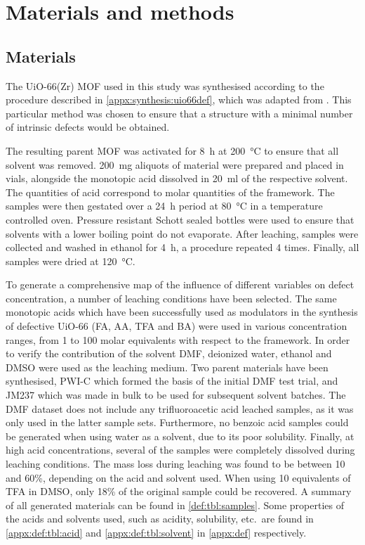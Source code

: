 
\section{Materials and methods}

\subsection{Materials}

The UiO-66(Zr) \gls{MOF} used in this study was synthesised according
to the procedure described in \autoref{appx:synthesis:uio66def},
which was adapted from \citet{shearerTunedPerfectionIroning2014}.
This particular method was chosen to ensure that a structure with
a minimal number of intrinsic defects would be obtained.

The resulting parent \gls{MOF} was activated for \SI{8}{\hour} at
\SI{200}{\degreeCelsius} to ensure that all solvent was removed.
\SI{200}{\milli\gram} aliquots of material were prepared and 
placed in vials, alongside the monotopic acid dissolved in
\SI{20}{\milli\litre} of the respective solvent. The quantities
of acid correspond to molar quantities of the framework.
The samples were then gestated over a \SI{24}{\hour} period
at \SI{80}{\degreeCelsius} in a temperature controlled oven.
Pressure resistant Schott sealed bottles were used to ensure that
solvents with a lower boiling point do not evaporate.
After leaching, samples were collected and washed in ethanol
for \SI{4}{\hour}, a procedure repeated 4 times. Finally, all 
samples were dried at \SI{120}{\degreeCelsius}.

To generate a comprehensive map of the influence
of different variables on defect concentration, a number of
leaching conditions have been selected. The same monotopic acids 
which have been successfully used
as modulators in the synthesis of defective UiO-66
(\gls{FA}, \gls{AA}, \gls{TFA} and \gls{BA}) 
were used in various concentration ranges,
from 1 to 100 molar equivalents with respect to the framework.
In order to verify the contribution of the solvent
\gls{DMF}, deionized water, ethanol and \gls{DMSO} 
were used as the leaching medium.
Two parent materials have been synthesised, PWI-C which formed 
the basis of the initial \gls{DMF} test trial, and JM237 which 
was made in bulk to be used for subsequent solvent batches.
The \gls{DMF} dataset does not include any trifluoroacetic acid
leached samples, as it was only used in the latter sample sets.
Furthermore, no benzoic acid samples could be generated when using
water as a solvent, due to its poor solubility. Finally, 
at high acid concentrations, several of the samples were completely
dissolved during leaching
conditions. The mass loss during leaching was found to be 
between 10 and 60\%, depending on the acid and solvent used.
When using 10 equivalents of \gls{TFA} in \gls{DMSO}, only 18\% of the 
original sample could be recovered. 
A summary of all generated materials can be found in
\autoref{def:tbl:samples}.
Some properties of the acids and solvents used, such as acidity,
solubility, etc.\ are found in 
\autoref{appx:def:tbl:acid} and \autoref{appx:def:tbl:solvent} in 
\autoref{appx:def} respectively.

